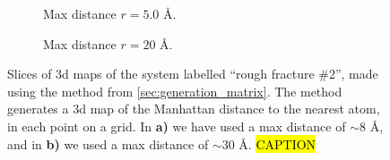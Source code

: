 \begin{figure}[htpb]%
    \centering%
    \setlength{\myfigwidth}{0.9\textwidth}%
    \begin{subfigure}[b]{\myfigwidth}%
        \caption{Max distance $r=5.0$ \AA.%
        \label{fig:generation_matrix_r05}}%
    \end{subfigure}%
    \vspace{10pt}
    \begin{subfigure}[b]{\myfigwidth}%
        \caption{Max distance $r=20$ \AA.%
        \label{fig:generation_matrix_r11}}%
    \end{subfigure}%
    \caption{%
        Slices of 3d maps of the system labelled ``rough fracture \#2'', made using the method from \cref{sec:generation_matrix}. The method generates a 3d map of the Manhattan distance to the nearest atom, in each point on a grid. In \textbf{a)} we have used a max distance of $\sim 8$ \AA, and in \textbf{b)} we used a max distance of $\sim 30$ \AA.%
        \hl{CAPTION}%
    }%
\end{figure}%